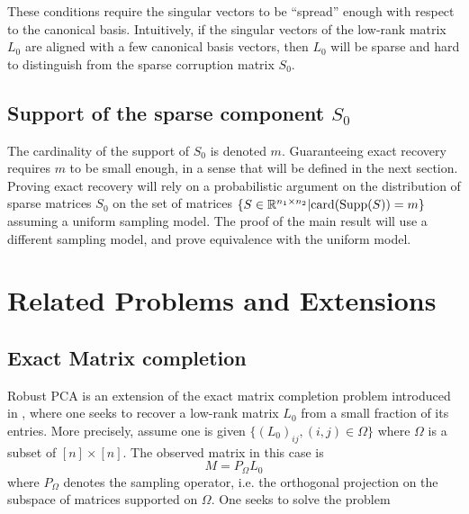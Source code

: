 \documentclass{../common/projectreport}
\begin{document}
These conditions require the singular vectors to be ``spread'' enough with respect to the canonical basis. Intuitively, if the singular vectors of the low-rank matrix $L_0$ are aligned with a few canonical basis vectors, then $L_0$ will be sparse and hard to distinguish from the sparse corruption matrix $S_0$.



\subsection{Support of the sparse component $S_0$}
The cardinality of the support of $S_0$ is denoted $m$. Guaranteeing exact recovery requires $m$ to be small enough, in a sense that will be defined in the next section. Proving exact recovery will rely on a probabilistic argument on the distribution of sparse matrices $S_0$ on the set of matrices $\{ S \in {\mathbb R}^{n_1 \times n_2} | \text{card}(\text{Supp}(S)) = m \}$ assuming a uniform sampling model. The proof of the main result will use a different sampling model, and prove equivalence with the uniform model.









\newpage
\section{Related Problems and Extensions}


\subsection{Exact Matrix completion}
Robust PCA is an extension of the exact matrix completion problem introduced in \cite{Candes:2009uq}, where one seeks to recover a low-rank matrix $L_0$ from a small fraction of its entries. More precisely, assume one is given $\{(L_0)_{ij}, (i,j)\in \Omega\}$ where $\Omega$ is a subset of $[n]\times [n]$. The observed matrix in this case is 
\[
M = P_\Omega L_0
\]
where $P_\Omega$ denotes the sampling operator, i.e. the orthogonal projection on the subspace of matrices supported on $\Omega$. One seeks to solve the problem
\end{document}
